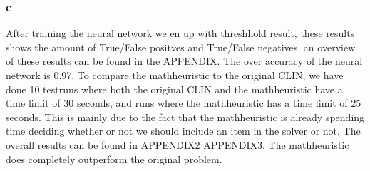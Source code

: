 \subsubsection*{c}
After training the neural network we en up with threshhold result, these results shows the amount of True/False positves and True/False negatives, an overview of these results can be found in the APPENDIX. The over accuracy of the neural network is 0.97. To compare the mathheuristic to the original CLIN, we have done 10 testruns where both the original CLIN and the mathheuristic have a time limit of 30 seconds, and runs where the mathheuristic has a time limit of 25 seconds. This is mainly due to the fact that the mathheuristic is already spending time deciding whether or not we should include an item in the solver or not. The overall results can be found in APPENDIX2 APPENDIX3. The mathheuristic does completely outperform the original problem.
